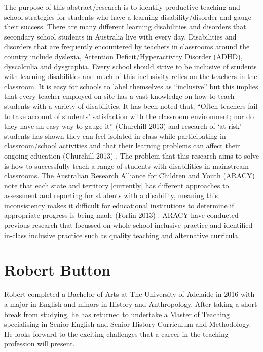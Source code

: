 \documentclass[twoside,14pt,a4paper,notitlepage]{memoir}
\begin{document}
The purpose of this abstract/research is to identify productive teaching and school strategies for students who have a learning disability/disorder and gauge their success. There are many different learning disabilities and disorders that secondary school students in Australia live with every day. Disabilities and disorders that are frequently encountered by teachers in classrooms around the country include dyslexia, Attention Deficit/Hyperactivity Disorder (ADHD), dyscalculia and dysgraphia. Every school should strive to be inclusive of students with learning disabilities and much of this inclusivity relies on the teachers in the classroom. It is easy for schools to label themselves as “inclusive” but this implies that every teacher employed on site has a vast knowledge on how to teach students with a variety of disabilities. It has been noted that, “Often teachers fail to take account of students’ satisfaction with the classroom environment; nor do they have an easy way to gauge it” (Churchill 2013) and research of ‘at risk’ students has shown they can feel isolated in class while participating in classroom/school activities and that their learning problems can affect their ongoing education (Churchill 2013) . The problem that this research aims to solve is how to successfully teach a range of students with disabilities in mainstream classrooms. The Australian Research Alliance for Children and Youth (ARACY) note that each state and territory [currently] has different approaches to assessment and reporting for students with a disability, meaning this inconsistency makes it difficult for educational institutions to determine if appropriate progress is being made (Forlin 2013) . ARACY have conducted previous research that focussed on whole school inclusive practice and identified in-class inclusive practice such as quality teaching and alternative curricula.

\section*{Robert Button}

Robert completed a Bachelor of Arts at The University of Adelaide in 2016 with a major in English and minors in History and Anthropology. After taking a short break from studying, he has returned to undertake a Master of Teaching specialising in Senior English and Senior History Curriculum and Methodology. He looks forward to the exciting challenges that a career in the teaching profession will present.
 
\end{document}
